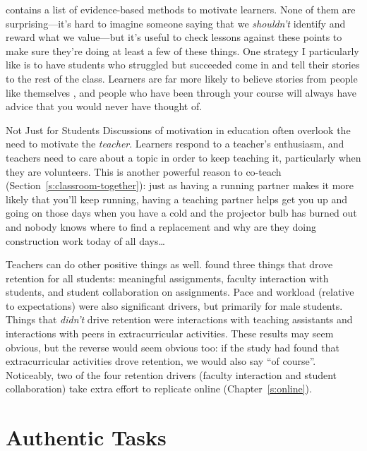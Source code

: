 \cite{Ambr2010} contains a list of evidence-based methods to motivate
learners. None of them are surprising---it's hard to imagine someone
saying that we \emph{shouldn't} identify and reward what we value---but it's
useful to check lessons against these points to make sure they're doing
at least a few of these things. One strategy I particularly like is to
have students who struggled but succeeded come in and tell their stories
to the rest of the class. Learners are far more likely to believe
stories from people like themselves \cite{Mill2016a}, and people who
have been through your course will always have advice that you would
never have thought of.

\begin{aside}{Not Just for Students}
  Discussions of motivation in education often overlook the need to
  motivate the \emph{teacher}. Learners respond to a teacher's enthusiasm,
  and teachers need to care about a topic in order to keep teaching it,
  particularly when they are volunteers. This is another powerful reason
  to co-teach (Section~\ref{s:classroom-together}): just as having a
  running partner makes it more likely that you'll keep running, having
  a teaching partner helps get you up and going on those days when you
  have a cold and the projector bulb has burned out and nobody knows
  where to find a replacement and why are they doing construction work
  today of all days{\ldots}
\end{aside}

Teachers can do other positive things as well. \cite{Bark2014} found
three things that drove retention for all students: meaningful
assignments, faculty interaction with students, and student
collaboration on assignments. Pace and workload (relative to
expectations) were also significant drivers, but primarily for male
students. Things that \emph{didn't} drive retention were interactions with
teaching assistants and interactions with peers in extracurricular
activities. These results may seem obvious, but the reverse would seem
obvious too: if the study had found that extracurricular activities
drove retention, we would also say ``of course''. Noticeably, two of the
four retention drivers (faculty interaction and student collaboration)
take extra effort to replicate online (Chapter~\ref{s:online}).

\section{Authentic Tasks}\label{s:motivation-authentic}

